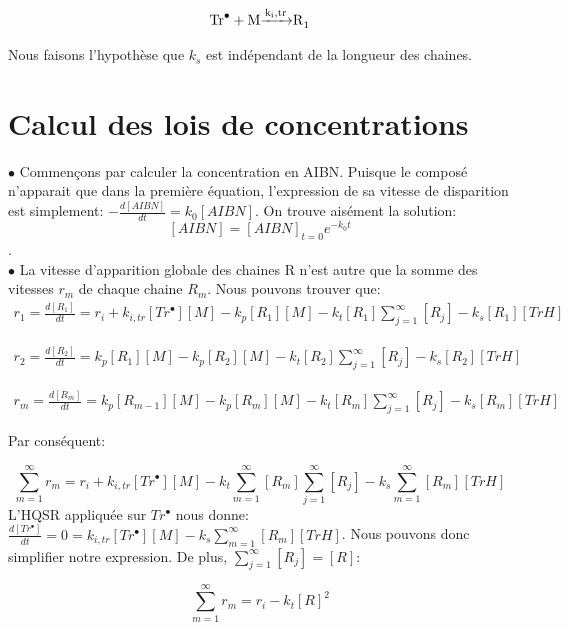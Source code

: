 \documentclass[a4paper,oneside,12pt]{article}
\begin{document}
\begin{equation}
\ce{Tr^{\bullet} + M \xrightarrow{k_i,tr} R_{1}}
\end{equation}

Nous faisons l'hypothèse que $k_s$ est indépendant de la longueur des chaines.
\section{Calcul des lois de concentrations}
$\bullet$ Commençons par calculer la concentration en AIBN. Puisque le composé n'apparait que dans la première équation, l'expression de sa vitesse de disparition est simplement: $-\frac{d[AIBN]}{dt}=k_{0}[AIBN]$. On trouve aisément la solution: $$[AIBN]=[AIBN]_{t=0}e^{-k_{0}t} $$.\\

$\bullet$ La vitesse d'apparition globale des chaines R n'est autre que la somme des vitesses $r_{m}$ de chaque chaine $R_{m}$. Nous pouvons trouver que:
\begin{align*}
r_{1}=\frac{d[R_{1}]}{dt}=r_{i}+k_{i,tr}[Tr^{\bullet}][M]-k_p[R_{1}][M]-k_{t}[R_1]\sum\limits_{j=1}^\infty[R_j]-k_{s}[R_{1}][TrH]
\end{align*}

\begin{align*}
r_{2}=\frac{d[R_{2}]}{dt}=k_p[R_{1}][M]-k_p[R_{2}][M]-k_{t}[R_2]\sum\limits_{j=1}^\infty[R_j]-k_{s}[R_{2}][TrH]
\end{align*}

\begin{align*}
r_{m}=\frac{d[R_{m}]}{dt}=k_p[R_{m-1}][M]-k_p[R_{m}][M]-k_{t}[R_m]\sum\limits_{j=1}^\infty[R_j]-k_{s}[R_{m}][TrH]
\end{align*}

Par conséquent:

\begin{equation}
\sum\limits_{m=1}^\infty r_{m}=r_i+ k_{i,tr}[Tr^{\bullet}][M] -k_{t}\sum\limits_{m=1}^\infty [R_m] \sum\limits_{j=1}^\infty[R_j]-k_{s}\sum\limits_{m=1}^\infty[R_{m}][TrH]
\end{equation}
L'HQSR appliquée sur $Tr^{\bullet}$ nous donne: $\frac{d[Tr^{\bullet}]}{dt}=0=k_{i,tr}[Tr^{\bullet}][M]-k_{s}\sum\limits_{m=1}^\infty[R_{m}][TrH]$. Nous pouvons donc simplifier notre expression. De plus, $\sum\limits_{j=1}^\infty[R_j] = [R]$:

\begin{equation}
\sum\limits_{m=1}^\infty r_{m}=r_i-k_{t}[R]^2
\end{equation}
\end{document}
